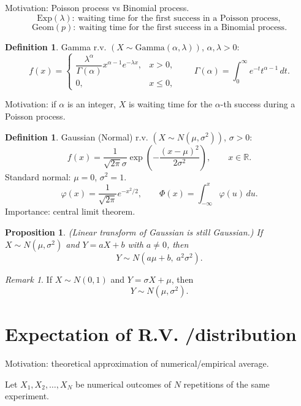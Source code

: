 \documentclass[11pt]{article}
\theoremstyle{plain}
\newtheorem{proposition}[theorem]{Proposition}
\theoremstyle{definition}
\newtheorem{definition}[theorem]{Definition}
\theoremstyle{remark}
\newtheorem{remark}[theorem]{Remark}
\begin{document}
	Motivation:
	Poisson process vs Binomial process.
	\[
	\mathrm{Exp}(\lambda):\ \text{waiting time for the first success in a Poisson process}, \]
	\[
	\mathrm{Geom}(p):\ \text{waiting time for the first success in a Binomial process}.
	\]
	
	\begin{definition}
		Gamma r.v. \((X\sim \mathrm{Gamma}(\alpha,\lambda))\), \(\alpha,\lambda>0\):
		\[
		f(x)=
		\begin{cases}
			\dfrac{\lambda^{\alpha}}{\Gamma(\alpha)}x^{\alpha-1}e^{-\lambda x}, & x>0,\\[10pt]
			0, & x\le 0,
		\end{cases}
		\qquad
		\Gamma(\alpha)=\int_{0}^{\infty} e^{-t}t^{\alpha-1}\,dt.
		\]
	\end{definition}
	
	Motivation: if \(\alpha\) is an integer, \(X\) is waiting time for the \(\alpha\)-th success during a Poisson process.
	
	\begin{definition}
		Gaussian (Normal) r.v. \((X\sim N(\mu,\sigma^2))\), \(\sigma>0\):
		\[
		f(x)=\frac{{1}}{\sqrt{2\pi}\sigma}\exp\!\left(-\frac{(x-\mu)^2}{2\sigma^2}\right),
		\qquad x\in\mathbb{R}.
		\]
		Standard normal: \(\mu=0\), \(\sigma^2=1\).
		\[
		\varphi(x)=\frac{1}{\sqrt{2\pi}}e^{-x^2/2},
		\qquad
		\Phi(x)=\int_{-\infty}^{x}\varphi(u)\,du.
		\]
		Importance: central limit theorem.
	\end{definition}
	
	\begin{proposition}
		(Linear transform of Gaussian is still Gaussian.)
		If \(X\sim N(\mu,\sigma^2)\) and \(Y=aX+b\) with \(a\ne 0\), then
		\[
		Y\sim N(a\mu+b,\ a^2\sigma^2).
		\]
	\end{proposition}
	
	\begin{remark}
		If \(X\sim N(0,1)\) and \(Y=\sigma X+\mu\), then
		\[
		Y\sim N(\mu,\sigma^2).
		\]
	\end{remark}
	
	
	\section{Expectation of R.V. /distribution}
	
	
	
	Motivation: theoretical approximation of numerical/empirical average.
	
	Let \(X_1, X_2, \dots, X_N\) be numerical outcomes of \(N\) repetitions of the same experiment.
	
\end{document}
